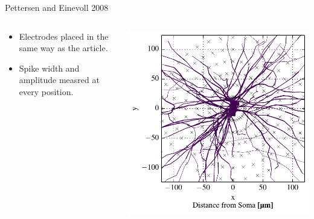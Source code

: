 \documentclass[aspectratio=169]{beamer}
\begin{document}
\begin{frame}{Pettersen and Einevoll 2008}
    \begin{columns}
        \begin{column}{0.48\textwidth}
            \begin{itemize}
                \item Electrodes placed in the same way as the article.
                \item Spike width and amplitude measred at every position.
            \end{itemize}
        \end{column}
        \begin{column}{0.48\textwidth}
            \begin{center}
                \includegraphics[width=\textwidth]{images/disc_morph_elec_xz.pdf}
            \end{center}
        \end{column}
    \end{columns}
\end{frame}
\end{document}
